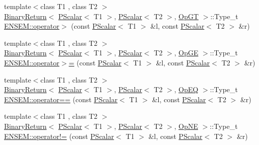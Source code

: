 \begin{DoxyCompactItemize}
\item 
{\footnotesize template$<$class T1 , class T2 $>$ }\\\mbox{\hyperlink{structENSEM_1_1BinaryReturn}{Binary\+Return}}$<$ \mbox{\hyperlink{classENSEM_1_1PScalar}{P\+Scalar}}$<$ T1 $>$, \mbox{\hyperlink{classENSEM_1_1PScalar}{P\+Scalar}}$<$ T2 $>$, \mbox{\hyperlink{structENSEM_1_1OpGT}{Op\+GT}} $>$\+::Type\+\_\+t \mbox{\hyperlink{group__primscalar_gac4bbd6e76f1d5dfb8c50417f131c43a0}{E\+N\+S\+E\+M\+::operator$>$}} (const \mbox{\hyperlink{classENSEM_1_1PScalar}{P\+Scalar}}$<$ T1 $>$ \&l, const \mbox{\hyperlink{classENSEM_1_1PScalar}{P\+Scalar}}$<$ T2 $>$ \&r)
\item 
{\footnotesize template$<$class T1 , class T2 $>$ }\\\mbox{\hyperlink{structENSEM_1_1BinaryReturn}{Binary\+Return}}$<$ \mbox{\hyperlink{classENSEM_1_1PScalar}{P\+Scalar}}$<$ T1 $>$, \mbox{\hyperlink{classENSEM_1_1PScalar}{P\+Scalar}}$<$ T2 $>$, \mbox{\hyperlink{structENSEM_1_1OpGE}{Op\+GE}} $>$\+::Type\+\_\+t \mbox{\hyperlink{group__primscalar_ga149cf6b2bcbe466aae6c6e90ee265c50}{E\+N\+S\+E\+M\+::operator$>$=}} (const \mbox{\hyperlink{classENSEM_1_1PScalar}{P\+Scalar}}$<$ T1 $>$ \&l, const \mbox{\hyperlink{classENSEM_1_1PScalar}{P\+Scalar}}$<$ T2 $>$ \&r)
\item 
{\footnotesize template$<$class T1 , class T2 $>$ }\\\mbox{\hyperlink{structENSEM_1_1BinaryReturn}{Binary\+Return}}$<$ \mbox{\hyperlink{classENSEM_1_1PScalar}{P\+Scalar}}$<$ T1 $>$, \mbox{\hyperlink{classENSEM_1_1PScalar}{P\+Scalar}}$<$ T2 $>$, \mbox{\hyperlink{structENSEM_1_1OpEQ}{Op\+EQ}} $>$\+::Type\+\_\+t \mbox{\hyperlink{group__primscalar_ga2834c2d31221ad19c3251f77a4b404f4}{E\+N\+S\+E\+M\+::operator==}} (const \mbox{\hyperlink{classENSEM_1_1PScalar}{P\+Scalar}}$<$ T1 $>$ \&l, const \mbox{\hyperlink{classENSEM_1_1PScalar}{P\+Scalar}}$<$ T2 $>$ \&r)
\item 
{\footnotesize template$<$class T1 , class T2 $>$ }\\\mbox{\hyperlink{structENSEM_1_1BinaryReturn}{Binary\+Return}}$<$ \mbox{\hyperlink{classENSEM_1_1PScalar}{P\+Scalar}}$<$ T1 $>$, \mbox{\hyperlink{classENSEM_1_1PScalar}{P\+Scalar}}$<$ T2 $>$, \mbox{\hyperlink{structENSEM_1_1OpNE}{Op\+NE}} $>$\+::Type\+\_\+t \mbox{\hyperlink{group__primscalar_ga684a2a9e7e4ca7bc1f740a291a847808}{E\+N\+S\+E\+M\+::operator!=}} (const \mbox{\hyperlink{classENSEM_1_1PScalar}{P\+Scalar}}$<$ T1 $>$ \&l, const \mbox{\hyperlink{classENSEM_1_1PScalar}{P\+Scalar}}$<$ T2 $>$ \&r)
\item 

\end{DoxyCompactItemize}
